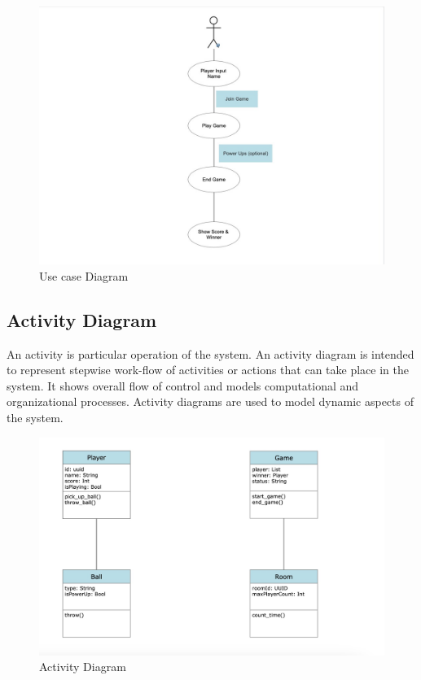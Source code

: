 \documentclass[12pt]{report}
\begin{document}
\vspace{1.5cm}
\begin{figure}[h]
\centering
\includegraphics[scale=0.7]{images15.png}
\caption{Use case Diagram}
\label{ Use case Diagram}
\end{figure}

\justifying
\setlength{\parindent}{4em}
\setlength{\parskip}{0.5em}
\renewcommand{\baselinestretch}{1.5}
\normalsize
\subsection{Activity Diagram}
An activity is particular operation of the system. An activity diagram is intended to represent
stepwise work-flow of activities or actions that can take place in the system. It shows overall
flow of control and models computational and organizational processes. Activity diagrams
are used to model dynamic aspects of the system. 

\vspace{1.5cm}
\begin{figure}[h]
\centering
\includegraphics[scale=0.8]{images14.png}
\caption{Activity Diagram}
\label{Activity Diagram}
\end{figure}
\end{document}
